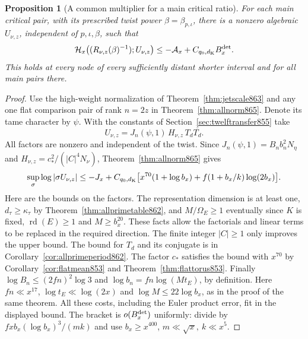\documentclass[a4paper,11pt]{article}
\newtheorem{proposition}{Proposition}[section]
\theoremstyle{definition}
\theoremstyle{remark}
\numberwithin{equation}{section}
\begin{document}
\begin{proposition}[A common multiplier for a main critical ratio]
\leavevmode\label{prop:mainheight866}
For each main critical pair, with its prescribed twist power
\(\beta=\beta_{p,\iota}\), there is a nonzero algebraic
\(U_{\nu,z}\), independent of \(p,\iota,\beta\), such that
\[
 \mathcal H_x\big((R_{\nu,z}(\beta)^{-1});U_{\nu,z}\big)
                    \le -\mathcal A_x+C_{q_0,d_{\rm K}}B_x^{\rm det}.
\]
This holds at every node of every sufficiently distant shorter
interval and for all main pairs there.
\end{proposition}
\begin{proof}
Use the high-weight normalization of Theorem~\ref{thm:jetscale863}
and any one flat comparison pair of rank \(n=2z\) in
Theorem~\ref{thm:allnorm865}. Denote its tame character by
\(\psi\). With the constants of Section~\ref{sec:twelftransfer855}
take
\[
           U_{\nu,z}= J_n(\psi,1)\,H_{\nu,z}\,T_d\overline{T_d}.
\]
All factors are nonzero and independent of the twist.
Since \(J_n(\psi,1)=B_n b_n^2 N_\eta\) and
\(H_{\nu,z}=c_*^2/(|C|^4 N_\nu)\), Theorem~\ref{thm:allnorm865}
gives
\[
 \sup_\sigma\log|\sigma U_{\nu,z}|
 \le -J_x+
 C_{q_0,d_{\rm K}}\big[
       x^{70}(1+\log b_x)+ f(1+b_x/k)\log(2b_x)\big].
\]
Here are the bounds on the factors. The representation dimension
is at least one, \(d_\tau\ge\kappa_\tau\) by
Theorem~\ref{thm:allprimetable862}, and \(M/\Omega_E\ge1\)
eventually since \(K\) is fixed, \(\operatorname{rd}(E)\ge1\)
and \(M\ge b_x^{20}\). These facts allow the factorials and
linear terms to be replaced in the required direction.
The finite integer \(|C|\ge1\) only improves the upper bound.
The bound for \(T_d\) and its conjugate is in
Corollary~\ref{cor:allprimeperiod862}. The factor \(c_*\)
satisfies the bound with \(x^{70}\) by
Corollary~\ref{cor:flatmean853} and Theorem~\ref{thm:flattorus853}.
Finally \(\log B_n\le(2fn)^2\log3\) and
\(\log b_n=fn\log(Mt_E)\), by definition. Here \(fn\ll x^{17}\),
\(\log t_E\ll\log(2x)\) and \(\log M\le22\log b_x\), as in the
proof of the same theorem. All these costs, including the
Euler product error, fit in the displayed bound. The bracket
is \(o(B_x^{\rm det})\) uniformly: divide by
\(fxb_x(\log b_x)^3/(mk)\) and use \(b_x\ge x^{400}\),
\(m\ll\sqrt x,\ k\ll x^5\).


\end{proof}
\end{document}
